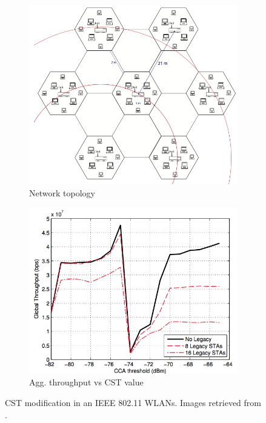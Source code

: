 \documentclass[12pt, a4paper,twoside]{tesi_upf}
\begin{document}
			\begin{figure}[t!]
				\centering
				\begin{subfigure}[b]{0.375\textwidth}
					\includegraphics[width=\textwidth]{images/jamil2014_1}
					\caption{Network topology}
					\label{fig:jamil_2014_1}
				\end{subfigure}
				\begin{subfigure}[b]{0.425\textwidth}
					\includegraphics[width=\textwidth]{images/jamil2014_2}
					\caption{Agg. throughput vs CST value}
					\label{fig:jamil_2014_2}
				\end{subfigure}		
				\caption{CST modification in an IEEE 802.11 WLANs. Images retrieved from \cite{jamil2014improving}.}
				\label{fig:jamil_2014}
			\end{figure}		
		
\end{document}
